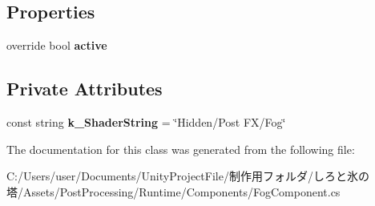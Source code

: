 \subsection*{Properties}
\begin{DoxyCompactItemize}
\item 
\mbox{\label{class_unity_engine_1_1_post_processing_1_1_fog_component_aea59b9db2bd9686b92d88154abc4de3c}} 
override bool {\bfseries active}
\end{DoxyCompactItemize}
\subsection*{Private Attributes}
\begin{DoxyCompactItemize}
\item 
\mbox{\label{class_unity_engine_1_1_post_processing_1_1_fog_component_aa2b40167cf4355d587e8655ab63c749f}} 
const string {\bfseries k\+\_\+\+Shader\+String} = \char`\"{}Hidden/Post FX/Fog\char`\"{}
\end{DoxyCompactItemize}


The documentation for this class was generated from the following file\+:\begin{DoxyCompactItemize}
\item 
C\+:/\+Users/user/\+Documents/\+Unity\+Project\+File/制作用フォルダ/しろと氷の塔/\+Assets/\+Post\+Processing/\+Runtime/\+Components/Fog\+Component.\+cs\end{DoxyCompactItemize}
